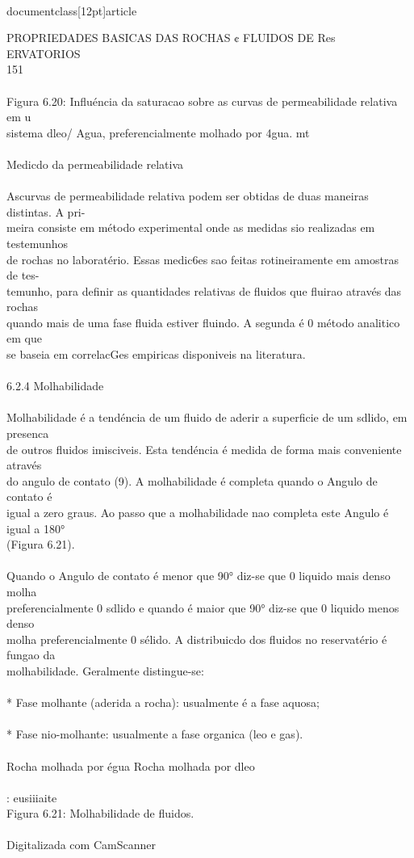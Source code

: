 \\documentclass[12pt]{article}
\begin{document}
PROPRIEDADES BASICAS DAS ROCHAS ¢ FLUIDOS DE Res\\
ERVATORIOS\\
151\\
\\
Figura 6.20: Influéncia da saturacao sobre as curvas de permeabilidade relativa em u\\
sistema dleo/ Agua, preferencialmente molhado por 4gua. mt\\
\\
Medicdo da permeabilidade relativa\\
\\
Ascurvas de permeabilidade relativa podem ser obtidas de duas maneiras distintas. A pri-\\
meira consiste em método experimental onde as medidas sio realizadas em testemunhos\\
de rochas no laboratério. Essas medic6es sao feitas rotineiramente em amostras de tes-\\
temunho, para definir as quantidades relativas de fluidos que fluirao através das rochas\\
quando mais de uma fase fluida estiver fluindo. A segunda é 0 método analitico em que\\
se baseia em correlacGes empiricas disponiveis na literatura.\\
\\
6.2.4 Molhabilidade\\
\\
Molhabilidade é a tendéncia de um fluido de aderir a superficie de um sdlido, em presenca\\
de outros fluidos imisciveis. Esta tendéncia é medida de forma mais conveniente através\\
do angulo de contato (9). A molhabilidade é completa quando o Angulo de contato é\\
igual a zero graus. Ao passo que a molhabilidade nao completa este Angulo é igual a 180°\\
(Figura 6.21).\\
\\
Quando o Angulo de contato é menor que 90° diz-se que 0 liquido mais denso molha\\
preferencialmente 0 sdlido e quando é maior que 90° diz-se que 0 liquido menos denso\\
molha preferencialmente 0 sélido. A distribuicdo dos fluidos no reservatério é fungao da\\
molhabilidade. Geralmente distingue-se:\\
\\
* Fase molhante (aderida a rocha): usualmente é a fase aquosa;\\
\\
* Fase nio-molhante: usualmente a fase organica (leo e gas).\\
\\
Rocha molhada por égua Rocha molhada por dleo\\
\\
: eusiiiaite\\
Figura 6.21: Molhabilidade de fluidos.\\
\\
Digitalizada com CamScanner\\
\end{document}
